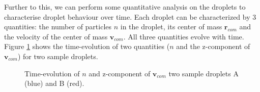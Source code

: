 \documentclass[a4paper,10pt]{article}
\begin{document}
Further to this, we can perform some quantitative analysis on the droplets to characterise droplet behaviour over time. Each droplet can be characterized by 3 quantities: the number of particles $n$ in the droplet, its center of mass $\mathbf{r}_{com}$ and the velocity of the center of mass $\mathbf{v}_{com}$. All three quantities evolve with time. Figure \ref{fig:tevol1} shows the time-evolution of two quantities ($n$ and the z-component of $\mathbf{v}_{com}$) for two sample droplets.
\begin{figure}[htp]
\centering
{}
\caption{Time-evolution of $n$ and z-component of $\mathbf{v}_{com}$ two sample droplets A (blue) and B (red).}
\label{fig:tevol1}
\end{figure}
\end{document}
